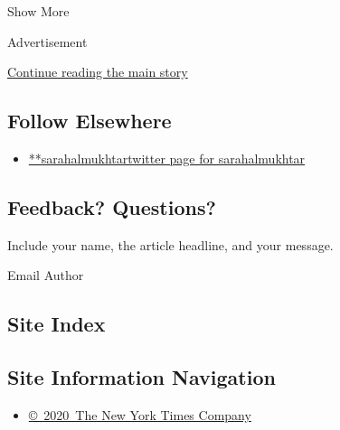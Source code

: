 Show More

Advertisement

\protect\hyperlink{after-mid2}{Continue reading the main story}

\hypertarget{follow-elsewhere}{%
\subsection{Follow Elsewhere}\label{follow-elsewhere}}

\begin{itemize}
\tightlist
\item
  \href{https://twitter.com/sarahalmukhtar}{**sarahalmukhtartwitter page
  for sarahalmukhtar}
\end{itemize}

\hypertarget{feedback-questions}{%
\subsection{Feedback? Questions?}\label{feedback-questions}}

Include your name, the article headline, and your message.

Email Author

\hypertarget{site-index}{%
\subsection{Site Index}\label{site-index}}

\hypertarget{site-information-navigation}{%
\subsection{Site Information
Navigation}\label{site-information-navigation}}

\begin{itemize}
\tightlist
\item
  \href{https://help.nytimes3xbfgragh.onion/hc/en-us/articles/115014792127-Copyright-notice}{©~2020~The
  New York Times Company}
\end{itemize}


